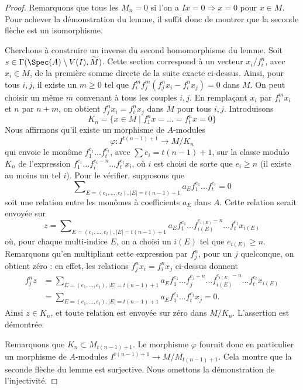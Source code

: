 \begin{proof}
\medskip\noindent
Remarquons que tous les $M_n = 0$ si l'on a
$Ix = 0 \Rightarrow x = 0$ pour $x \in M$. Pour
achever la démonstration du lemme, il suffit donc de montrer que
la seconde flèche est un isomorphisme.

\medskip\noindent
Cherchons à construire un inverse du second homomorphisme du lemme.
Soit $s \in \Gamma(\Spec(A) \setminus V(I), \widetilde{M})$.
Cette section correspond à un vecteur $x_i/f_i^n$, avec $x_i \in M$, de la
première somme directe de la suite exacte ci-dessus.
Ainsi, pour tous $i, j$, il existe un $m \geq 0$
tel que $f_i^m f_j^m (f_j^n x_i - f_i^n x_j) = 0$ dans $M$.
On peut choisir un même $m$ convenant à tous les couples $i, j$.
En remplaçant $x_i$ par $f_i^mx_i$ et $n$ par $n + m$, on
obtient $f_j^nx_i = f_i^nx_j$ dans $M$ pour tous $i, j$.
Introduisons
$$
K_n = \{x \in M \mid f_1^nx = \ldots = f_t^nx = 0\}
$$
Nous affirmons qu'il existe un morphisme de $A$-modules
$$
\varphi :
I^{t(n - 1) + 1}
\longrightarrow
M/K_n
$$
qui envoie le monôme
$f_1^{e_1} \ldots f_t^{e_t}$, avec $\sum e_i = t(n - 1) + 1$,
sur la classe modulo $K_n$ de l'expression
$f_1^{e_1} \ldots f_i^{e_i - n} \ldots f_t^{e_t}x_i$,
où $i$ est choisi de sorte que $e_i \geq n$ (il existe
au moins un tel $i$).
Pour le vérifier, supposons que
$$
\sum\nolimits_{E = (e_1, \ldots, e_t), |E| = t(n - 1) + 1}
a_E f_1^{e_1} \ldots f_t^{e_t} = 0
$$
soit une relation entre les monômes à coefficients $a_E$ dans $A$.
Cette relation serait envoyée sur
$$
z =
\sum\nolimits_{E = (e_1, \ldots, e_t), |E| = t(n - 1) + 1}
a_E f_1^{e_1} \ldots f_{i(E)}^{e_{i(E)} - n} \ldots f_t^{e_t}x_{i(E)}
$$
où, pour chaque multi-indice $E$, on a choisi un $i(E)$
tel que $e_{i(E)} \geq n$.
Remarquons qu'en multipliant cette expression par $f_j^n$, pour un $j$ quelconque,
on obtient zéro : en effet, les relations $f_j^nx_i = f_i^nx_j$ ci-dessus donnent
\begin{align*}
f_j^nz & = \sum\nolimits_{E = (e_1, \ldots, e_t), |E| = t(n - 1) + 1}
a_E f_1^{e_1} \ldots f_j^{e_j + n}
\ldots f_{i(E)}^{e_{i(E)} - n} \ldots f_t^{e_t}x_{i(E)} \\
& =
\sum\nolimits_{E = (e_1, \ldots, e_t), |E| = t(n - 1) + 1}
a_E f_1^{e_1} \ldots f_t^{e_t}x_j
= 0.
\end{align*}
Ainsi $z \in K_n$, et toute relation est envoyée sur zéro
dans $M/K_n$. L'assertion est démontrée.

\medskip\noindent
Remarquons que $K_n \subset M_{t(n - 1) + 1}$. Le
morphisme $\varphi$ fournit donc en particulier un morphisme de $A$-modules
$I^{t(n - 1) + 1} \to M/M_{t(n - 1) + 1}$.
Cela montre que la seconde flèche du lemme est surjective. Nous
omettons la démonstration de l'injectivité.
\end{proof}

